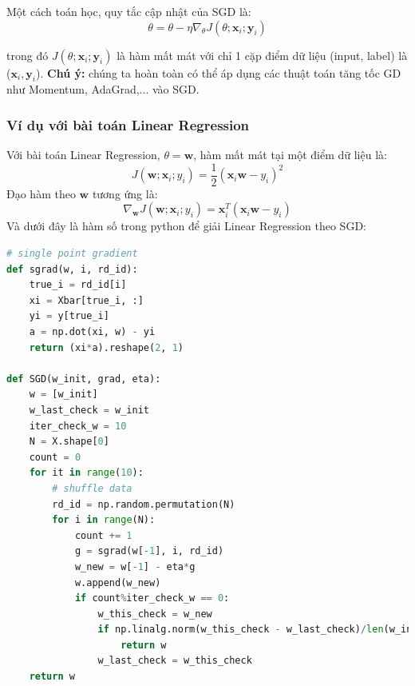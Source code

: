  
Một cách toán học, quy tắc cập nhật của SGD là: 
\begin{equation} 
\theta = \theta - \eta \nabla_{\theta} J(\theta; \mathbf{x}_i; \mathbf{y}_i) 
\end{equation} 
 
trong đó $J(\theta; \mathbf{x}_i; \mathbf{y}_i)$ là hàm mất mát với chỉ 1 cặp điểm dữ liệu (input, label) là ($\mathbf{x}_i, \mathbf{y}_i$). \textbf{Chú ý:} chúng ta hoàn toàn có thể áp dụng các thuật toán tăng tốc GD như Momentum, AdaGrad,... vào SGD. 
 
 
\subsubsection{Ví dụ với bài toán Linear Regression}
Với bài toán Linear Regression, $\theta = \mathbf{w}$, hàm mất mát tại một điểm dữ liệu là: 
\begin{equation} 
J(\mathbf{w}; \mathbf{x}_i; y_i) = \frac{1}{2}(\mathbf{x}_i \mathbf{w} - y_i)^2 
\end{equation} 
Đạo hàm theo $\mathbf{w}$ tương ứng là: 
\begin{equation} 
\nabla_{\mathbf{w}}J(\mathbf{w}; \mathbf{x}_i; y_i) = \mathbf{x}_i^T(\mathbf{x}_i \mathbf{w} - y_i) 
\end{equation} 
Và dưới đây là hàm số trong python để giải Linear Regression theo SGD: 
 
 
 
 
 
 
\begin{lstlisting}[language=Python]
# single point gradient 
def sgrad(w, i, rd_id): 
    true_i = rd_id[i] 
    xi = Xbar[true_i, :] 
    yi = y[true_i] 
    a = np.dot(xi, w) - yi 
    return (xi*a).reshape(2, 1) 
 
def SGD(w_init, grad, eta): 
    w = [w_init] 
    w_last_check = w_init 
    iter_check_w = 10 
    N = X.shape[0] 
    count = 0 
    for it in range(10): 
        # shuffle data  
        rd_id = np.random.permutation(N) 
        for i in range(N): 
            count += 1  
            g = sgrad(w[-1], i, rd_id) 
            w_new = w[-1] - eta*g 
            w.append(w_new) 
            if count%iter_check_w == 0: 
                w_this_check = w_new                  
                if np.linalg.norm(w_this_check - w_last_check)/len(w_init) < 1e-3:                                     
                    return w 
                w_last_check = w_this_check 
    return w 
\end{lstlisting}
 
